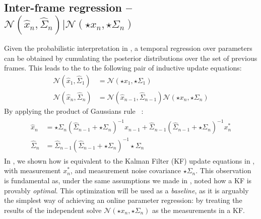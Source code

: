 \subsection{Inter-frame regression -- $\mathcal{N}(\hat{x}_n, \hat{\Sigma}_n) | \mathcal{N}(\star{x}_n, \star{\Sigma}_n)$ } 
\label{sec:combining}
\label{sec:inter}
Given the probabilistic interpretation in , a temporal regression over parameters can be obtained by cumulating the posterior distributions over the set of previous frames. This leads to the to the following pair of inductive update equations:
% 
\begin{align}
\mathcal{N}(\hat{x}_1, \hat{\Sigma}_1) &= \mathcal{N}(\star{x}_1, \star{\Sigma}_1) \\
\mathcal{N}(\hat{x}_n, \hat{\Sigma}_n) &= \mathcal{N}(\hat{x}_{n-1}, \hat{\Sigma}_{n-1}) \mathcal{N}(\star{x}_n, \star{\Sigma}_n)
\end{align}
% 
By applying the product of Gaussians rule ~\cite{petersen2008matrix}:
% 
\begin{align}
\begin{split}
\hat{x}_{n} &= \star\Sigma_{n} (\hat{\Sigma}_{n-1} + \star\Sigma_{n})^{-1} \hat{x}_{n-1} + 
\hat{\Sigma}_{n-1} (\hat{\Sigma}_{n-1} + \star\Sigma_n)^{-1} x_n^*
\\
\hat{\Sigma}_n &= \hat{\Sigma}_{n-1} (\hat{\Sigma}_{n-1} + {\star\Sigma_n})^{-1} \star\Sigma_n
\label{eq:combining}
\end{split}
\end{align}
% 
In , we shown how  is equivalent to the Kalman Filter (KF) update equations in , with measurement $x_n^*$, and measurement noise covariance $\star\Sigma_n$. This observation is fundamental as, under the same assumptions we made in , \cite[]{maybeck1979stochastic} noted how a KF is provably \emph{optimal}.
This optimization will be used as a \emph{baseline}, as it is arguably the simplest way of achieving an online parameter regression: by treating the results of the independent solve $\mathcal{N}(\star{x}_n, \star{\Sigma}_n)$ as the measurements in a KF.

